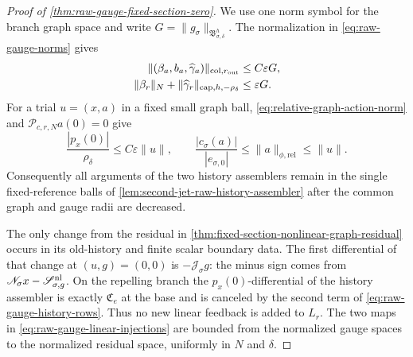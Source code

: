 \begin{proof}[Proof of
\cref{thm:raw-gauge-fixed-section-zero}]
We use one norm symbol for the branch graph space and write
\(G=\|g_\sigma\|_{\mathfrak B_{\sigma,\delta}^h}\).
The normalization in \cref{eq:raw-gauge-norms} gives
\begin{align}
 \|(\beta_a,b_a,\widehat\gamma_a)\|_
      {\mathrm{col},r_{\rm out}}
 &\le C\varepsilon G,\notag\\
 \|\beta_r\|_N+
   \|\widehat\gamma_r\|_{\mathrm{cap},h,-\rho_\delta}
 &\le\varepsilon G.                              \label{eq:proof-raw-gauge-data-scales}
\end{align}
For a trial \(u=(x,a)\) in a fixed small graph ball,
\cref{eq:relative-graph-action-norm} and
\(\mathscr P_{c,r,N}a(0)=0\) give
\begin{equation}
 \frac{|p_x(0)|}{\rho_\delta}
 \le C\varepsilon\|u\|,
 \qquad
 \frac{|c_\sigma(a)|}{|e_{\sigma,0}|}
 \le\|a\|_{\phi,\mathrm{rel}}
 \le\|u\|.                                      \label{eq:proof-raw-gauge-trial-scales}
\end{equation}
Consequently all arguments of the two history assemblers remain in the
single fixed-reference balls of
\cref{lem:second-jet-raw-history-assembler} after the common graph and
gauge radii are decreased.

The only change from the residual in
\cref{thm:fixed-section-nonlinear-graph-residual} occurs in its old-history
and finite scalar boundary data.  The first differential of that change at
\((u,g)=(0,0)\) is \(-\mathscr J_\sigma g\): the minus sign comes from
\(\mathscr N_\sigma x-\mathscr S_{\sigma,g}^{\rm nl}\).  On the repelling
branch the \(p_x(0)\)-differential of the history assembler is exactly
\(\mathfrak C_e\) at the base and is canceled by the second term of
\cref{eq:raw-gauge-history-rows}.  Thus no new linear feedback is added to
\(L_r\).  The two maps in
\cref{eq:raw-gauge-linear-injections} are bounded from the normalized gauge
spaces to the normalized residual space, uniformly in \(N\) and \(\delta\).


\end{proof}
